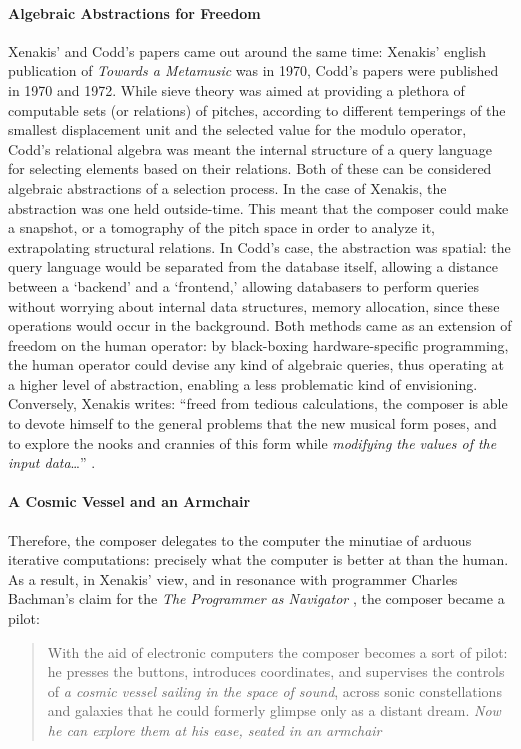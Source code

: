 \paragraph{Algebraic Abstractions for Freedom}
Xenakis' and Codd's papers came out around the same time: Xenakis' english publication of \textit{Towards a Metamusic} was in 1970, Codd's papers were published in 1970 and 1972. While sieve theory was aimed at providing a plethora of computable sets (or relations) of pitches, according to different temperings of the smallest displacement unit and the selected value for the modulo operator, Codd's relational algebra was meant the internal structure of a query language for selecting elements based on their relations. Both of these can be considered algebraic abstractions of a selection process. In the case of Xenakis, the abstraction was one held outside-time. This meant that the composer could make a snapshot, or a tomography of the pitch space in order to analyze it, extrapolating structural relations. In Codd's case, the abstraction was spatial: the query language would be separated from the database itself, allowing a distance between a `backend' and a `frontend,' allowing databasers to perform queries without worrying about internal data structures, memory allocation, since these operations would occur in the background. Both methods came as an extension of freedom on the human operator: by black-boxing hardware-specific programming, the human operator could devise any kind of algebraic queries, thus operating at a higher level of abstraction, enabling a less problematic kind of envisioning. Conversely, Xenakis writes: ``freed from tedious calculations, the composer is able to devote himself to the general problems that the new musical form poses, and to explore the nooks and crannies of this form while \textit{modifying the values of the input data}\dots'' \im \parencite[144]{Xen92:For}.

\paragraph{A Cosmic Vessel and an Armchair}
Therefore, the composer delegates to the computer the minutiae of arduous iterative computations: precisely what the computer is better at than the human. As a result, in Xenakis' view, and in resonance with programmer Charles Bachman's claim for the \textit{The Programmer as Navigator} \parencite{Bachman:1973:PN:355611.362534}, the composer became a pilot:

\begin{quote}
	With the aid of electronic computers the composer becomes a sort of pilot: he presses the buttons, introduces coordinates, and supervises the controls of \textit{a cosmic vessel sailing in the space of sound}, across sonic constellations and galaxies that he could formerly glimpse only as a distant dream. \textit{Now he can explore them at his ease, seated in an armchair} \im \parencite[144]{Xen92:For}
\end{quote}


